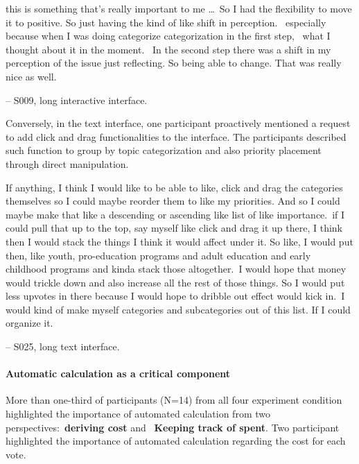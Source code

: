 \begin{displayquote}
\bracketellipsis this is something that's really important to me \ldots\ So I had the flexibility to move it to positive. So just having the kind of like shift in perception. ~\bracketellipsis especially because when I was doing categorize categorization in the first step, ~\bracketellipsis what I thought about it in the moment. ~\bracketellipsis In the second step there was a shift in my perception of the issue just reflecting. So being able to change. That was really nice as well. 

\noindent \hfill -- S009, long interactive interface.
\end{displayquote}

Conversely, in the text interface, one participant proactively mentioned a request to add click and drag functionalities to the interface. The participants described such function to group by topic categorization and also priority placement through direct manipulation. 

\begin{displayquote}
If anything, I think I would like to be able to like, click and drag the categories themselves so I could maybe reorder them to like my priorities. And so I could maybe make that like a descending or ascending like list of like importance.~\bracketellipsis if I could pull that up to the top, say myself like click and drag it up there, I think then I would stack the things I think it would affect under it. So like, I would put then, like youth, pro-education programs and adult education and early childhood programs and kinda stack those altogether.~\bracketellipsis I would hope that money would trickle down and also increase all the rest of those things. So I would put less upvotes in there because I would hope to dribble out effect would kick in.~\bracketellipsis I would kind of make myself categories and subcategories out of this list. If I could organize it.

\noindent \hfill -- S025, long text interface.
\end{displayquote}

\paragraph{Automatic calculation as a critical component}
More than one-third of participants (N=14) from all four experiment condition highlighted the importance of automated calculation from two perspectives:~\textbf{deriving cost} and ~\textbf{Keeping track of spent}. Two participant highlighted the importance of automated calculation regarding the cost for each vote.

